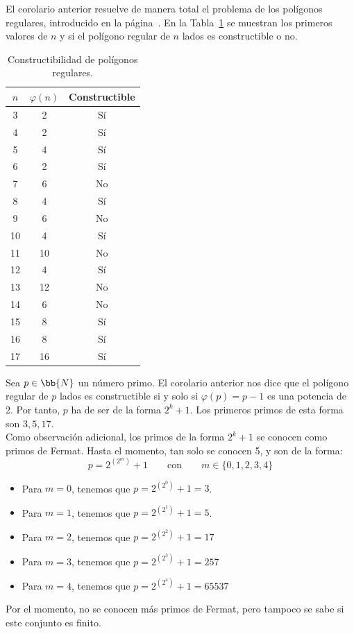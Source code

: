 El corolario anterior resuelve de manera total el problema de los polígonos regulares, introducido en la página~\pageref{parte:construcciones_regla_compas_i}. En la Tabla~\ref{tab:poligonos_constructibles} se muestran los primeros valores de $n$ y si el polígono regular de $n$ lados es constructible o no.
\begin{table}[h]
    \centering
    \begin{tabular}{c|c|c}
        $n$ & $\varphi(n)$ & Constructible \\
        \hline
        3 & 2 & Sí \\
        4 & 2 & Sí \\
        5 & 4 & Sí \\
        6 & 2 & Sí \\
        7 & 6 & No \\
        8 & 4 & Sí \\
        9 & 6 & No \\
        10 & 4 & Sí \\
        11 & 10 & No \\
        12 & 4 & Sí \\
        13 & 12 & No \\
        14 & 6 & No \\
        15 & 8 & Sí \\
        16 & 8 & Sí \\
        17 & 16 & Sí \\
    \end{tabular}
    \caption{Constructibilidad de polígonos regulares.}
    \label{tab:poligonos_constructibles}
\end{table}

\begin{ejemplo}
    Sea $p\in \bb{N}$ un número primo. El corolario anterior nos dice que el polígono regular de $p$ lados es constructible si y solo si $\varphi(p) = p-1$ es una potencia de 2. Por tanto, $p$ ha de ser de la forma $2^k+1$. Los primeros primos de esta forma son $3,5,17$.\\

    Como observación adicional, los primos de la forma $2^k+1$ se conocen como primos de Fermat. Hasta el momento, tan solo se conocen 5, y son de la forma:
    \begin{equation*}
        p = 2^{(2^m)} + 1\qquad \text{con}\qquad m\in \{0,1,2,3,4\}
    \end{equation*}
    \begin{itemize}
        \item Para $m=0$, tenemos que $p = 2^{(2^0)} + 1 = 3$.
        \item Para $m=1$, tenemos que $p = 2^{(2^1)} + 1 = 5$.
        \item Para $m=2$, tenemos que $p = 2^{(2^2)} + 1 = 17$
        \item Para $m=3$, tenemos que $p = 2^{(2^3)} + 1 = 257$
        \item Para $m=4$, tenemos que $p = 2^{(2^4)} + 1 = 65537$
    \end{itemize}

    Por el momento, no se conocen más primos de Fermat, pero tampoco se sabe si este conjunto es finito.
\end{ejemplo}
